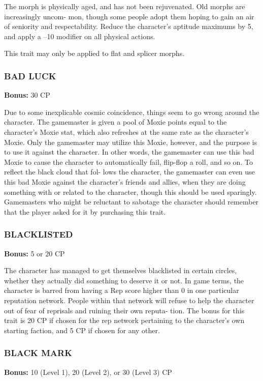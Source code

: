 The morph is physically aged, and has not been
rejuvenated. Old morphs are increasingly uncom-
mon, though some people adopt them hoping to
gain an air of seniority and respectability. Reduce
the character’s aptitude maximums by 5, and apply
a –10 modifier on all physical actions.

This trait may only be applied to flat and splicer
morphs.

\subsubsection{BAD LUCK}
\textbf{Bonus:} 30 CP

Due to some inexplicable cosmic coincidence,
things seem to go wrong around the character. The
gamemaster is given a pool of Moxie points equal
to the character’s Moxie stat, which also refreshes
at the same rate as the character’s Moxie. Only the
gamemaster may utilize this Moxie, however, and
the purpose is to use it against the character. In other
words, the gamemaster can use this bad Moxie to
cause the character to automatically fail, flip-flop a
roll, and so on. To reflect the black cloud that fol-
lows the character, the gamemaster can even use this
bad Moxie against the character’s friends and allies,
when they are doing something with or related to
the character, though this should be used sparingly.
Gamemasters who might be reluctant to sabotage the
character should remember that the player asked for
it by purchasing this trait.

\subsubsection{BLACKLISTED}
\textbf{Bonus:} 5 or 20 CP

The character has managed to get themselves
blacklisted in certain circles, whether they actually
did something to deserve it or not. In game terms, the
character is barred from having a Rep score higher
than 0 in one particular reputation network. People
within that network will refuse to help the character
out of fear of reprisals and ruining their own reputa-
tion. The bonus for this trait is 20 CP if chosen for the
rep network pertaining to the character’s own starting
faction, and 5 CP if chosen for any other.

\subsubsection{BLACK MARK}
\textbf{Bonus:} 10 (Level 1), 20 (Level 2), or 30 (Level 3) CP

